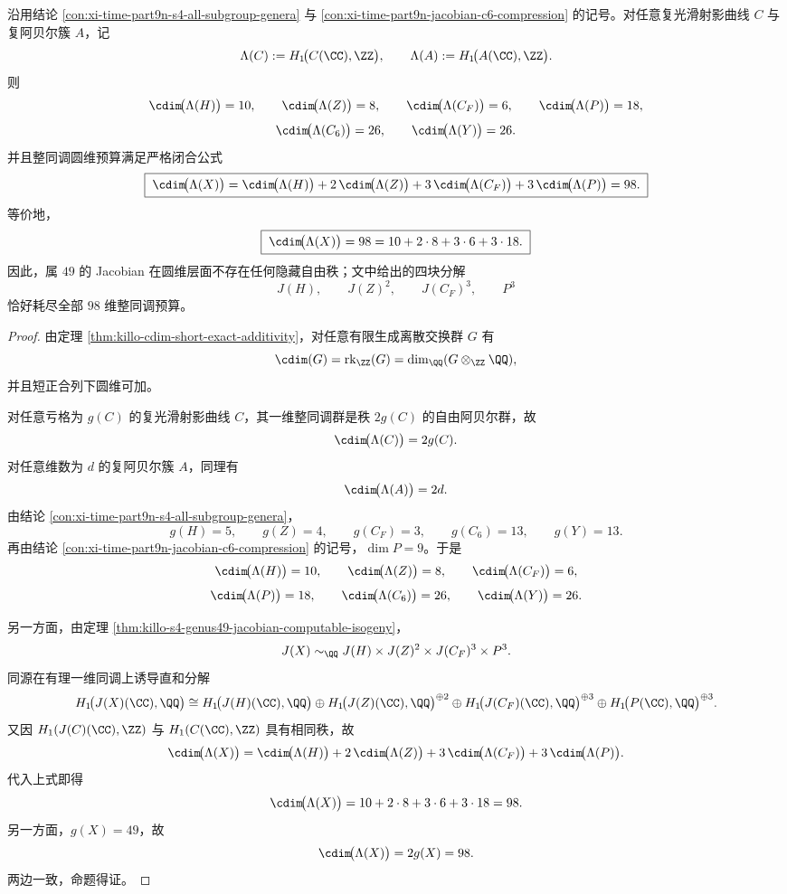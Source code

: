 \begin{theorem}\label{thm:xi-time-part9n-s4-hurwitz-circle-dimension-budget}
沿用结论 \ref{con:xi-time-part9n-s4-all-subgroup-genera} 与
\ref{con:xi-time-part9n-jacobian-c6-compression} 的记号。对任意复光滑射影曲线 \(C\) 与复阿贝尔簇 \(A\)，记
\[
\Lambda(C):=H_1\!\bigl(C(\CC),\ZZ\bigr),
\qquad
\Lambda(A):=H_1\!\bigl(A(\CC),\ZZ\bigr).
\]
则
\[
\cdim\!\bigl(\Lambda(H)\bigr)=10,\qquad
\cdim\!\bigl(\Lambda(Z)\bigr)=8,\qquad
\cdim\!\bigl(\Lambda(C_F)\bigr)=6,\qquad
\cdim\!\bigl(\Lambda(P)\bigr)=18,
\]
\[
\cdim\!\bigl(\Lambda(C_6)\bigr)=26,
\qquad
\cdim\!\bigl(\Lambda(Y)\bigr)=26.
\]
并且整同调圆维预算满足严格闭合公式
\[
\boxed{\;
\cdim\!\bigl(\Lambda(X)\bigr)
=
\cdim\!\bigl(\Lambda(H)\bigr)
+2\,\cdim\!\bigl(\Lambda(Z)\bigr)
+3\,\cdim\!\bigl(\Lambda(C_F)\bigr)
+3\,\cdim\!\bigl(\Lambda(P)\bigr)
=98.\;}
\]
等价地，
\[
\boxed{\;
\cdim\!\bigl(\Lambda(X)\bigr)=98=10+2\cdot 8+3\cdot 6+3\cdot 18.\;}
\]
因此，属 \(49\) 的 Jacobian 在圆维层面不存在任何隐藏自由秩；文中给出的四块分解
\[
J(H),\qquad J(Z)^2,\qquad J(C_F)^3,\qquad P^3
\]
恰好耗尽全部 \(98\) 维整同调预算。
\end{theorem}
\begin{proof}
由定理 \ref{thm:killo-cdim-short-exact-additivity}，对任意有限生成离散交换群 \(G\) 有
\[
\cdim(G)=\operatorname{rk}_{\ZZ}(G)=\dim_{\QQ}(G\otimes_{\ZZ}\QQ),
\]
并且短正合列下圆维可加。

对任意亏格为 \(g(C)\) 的复光滑射影曲线 \(C\)，其一维整同调群是秩 \(2g(C)\) 的自由阿贝尔群，故
\[
\cdim\!\bigl(\Lambda(C)\bigr)=2g(C).
\]
对任意维数为 \(d\) 的复阿贝尔簇 \(A\)，同理有
\[
\cdim\!\bigl(\Lambda(A)\bigr)=2d.
\]
由结论 \ref{con:xi-time-part9n-s4-all-subgroup-genera}，
\[
g(H)=5,\qquad g(Z)=4,\qquad g(C_F)=3,\qquad g(C_6)=13,\qquad g(Y)=13.
\]
再由结论 \ref{con:xi-time-part9n-jacobian-c6-compression} 的记号，\(\dim P=9\)。于是
\[
\cdim\!\bigl(\Lambda(H)\bigr)=10,\qquad
\cdim\!\bigl(\Lambda(Z)\bigr)=8,\qquad
\cdim\!\bigl(\Lambda(C_F)\bigr)=6,
\]
\[
\cdim\!\bigl(\Lambda(P)\bigr)=18,\qquad
\cdim\!\bigl(\Lambda(C_6)\bigr)=26,\qquad
\cdim\!\bigl(\Lambda(Y)\bigr)=26.
\]

另一方面，由定理 \ref{thm:killo-s4-genus49-jacobian-computable-isogeny}，
\[
J(X)\sim_{\QQ}J(H)\times J(Z)^2\times J(C_F)^3\times P^3.
\]
同源在有理一维同调上诱导直和分解
\[
H_1\!\bigl(J(X)(\CC),\QQ\bigr)
\cong
H_1\!\bigl(J(H)(\CC),\QQ\bigr)
\oplus
H_1\!\bigl(J(Z)(\CC),\QQ\bigr)^{\oplus 2}
\oplus
H_1\!\bigl(J(C_F)(\CC),\QQ\bigr)^{\oplus 3}
\oplus
H_1\!\bigl(P(\CC),\QQ\bigr)^{\oplus 3}.
\]
又因 \(H_1(J(C)(\CC),\ZZ)\) 与 \(H_1(C(\CC),\ZZ)\) 具有相同秩，故
\[
\cdim\!\bigl(\Lambda(X)\bigr)
=
\cdim\!\bigl(\Lambda(H)\bigr)
+2\,\cdim\!\bigl(\Lambda(Z)\bigr)
+3\,\cdim\!\bigl(\Lambda(C_F)\bigr)
+3\,\cdim\!\bigl(\Lambda(P)\bigr).
\]
代入上式即得
\[
\cdim\!\bigl(\Lambda(X)\bigr)=10+2\cdot 8+3\cdot 6+3\cdot 18=98.
\]
另一方面，\(g(X)=49\)，故
\[
\cdim\!\bigl(\Lambda(X)\bigr)=2g(X)=98.
\]
两边一致，命题得证。
\end{proof}

